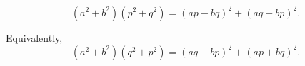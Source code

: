 $$(a^2 + b^2)(p^2 + q^2) = (ap - bq)^2 + (aq + bp)^2.$$

Equivalently,
$$(a^2 + b^2)(q^2 + p^2) = (aq - bp)^2 + (ap + bq)^2.$$
